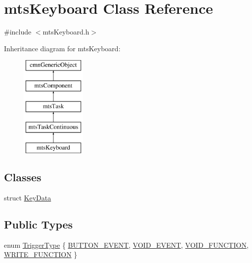 \hypertarget{classmts_keyboard}{\section{mts\-Keyboard Class Reference}
\label{classmts_keyboard}
}


{\ttfamily \#include $<$mts\-Keyboard.\-h$>$}

Inheritance diagram for mts\-Keyboard\-:\begin{figure}[H]
\begin{center}
\leavevmode
\includegraphics[height=5.000000cm]{d1/df6/classmts_keyboard}
\end{center}
\end{figure}
\subsection*{Classes}
\begin{DoxyCompactItemize}
\item 
struct \hyperlink{structmts_keyboard_1_1_key_data}{Key\-Data}
\end{DoxyCompactItemize}
\subsection*{Public Types}
\begin{DoxyCompactItemize}
\item 
enum \hyperlink{classmts_keyboard_a4a455c544287ea2a16f3353a5fe379c4}{Trigger\-Type} \{ \hyperlink{classmts_keyboard_a4a455c544287ea2a16f3353a5fe379c4a2005a59d8a3093caea39516bff3c1f68}{B\-U\-T\-T\-O\-N\-\_\-\-E\-V\-E\-N\-T}, 
\hyperlink{classmts_keyboard_a4a455c544287ea2a16f3353a5fe379c4af89c0f2b1fb07aa083081e2e6c37d07a}{V\-O\-I\-D\-\_\-\-E\-V\-E\-N\-T}, 
\hyperlink{classmts_keyboard_a4a455c544287ea2a16f3353a5fe379c4a7661678d0018e54f1aa6e9a7d4dabb2a}{V\-O\-I\-D\-\_\-\-F\-U\-N\-C\-T\-I\-O\-N}, 
\hyperlink{classmts_keyboard_a4a455c544287ea2a16f3353a5fe379c4acf111fcd06625697068ed28e8f5482ec}{W\-R\-I\-T\-E\-\_\-\-F\-U\-N\-C\-T\-I\-O\-N}
 \}
\end{DoxyCompactItemize}
